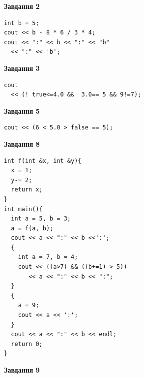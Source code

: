 \documentclass[12pt, ukrainian]{article}
\begin{document}
{\begin {large}
\begin{minipage}[t]{7.0cm}
\end{minipage}
\vline \hspace{1mm}
\begin{minipage}[t]{11.0cm}

\begin{center}
\textbf{Завдання 2}
\end{center}
\vspace{-8mm}

\begin{verbatim}
int b = 5;
cout << b - 8 * 6 / 3 * 4;
cout << ":" << b << ":" << "b" 
  << ":" << 'b';
\end{verbatim}



\begin{center}
\textbf{Завдання 3}
\end{center}
\vspace{-8mm}

\begin{verbatim}
cout 
  << (! true<=4.0 &&  3.0== 5 && 9!=7);
\end{verbatim}



\begin{center}
\textbf{Завдання 5}
\end{center}
\vspace{-8mm}

\begin{verbatim}
cout << (6 < 5.0 > false == 5);
\end{verbatim}



\begin{center}
\textbf{Завдання 8}
\end{center}
\vspace{-8mm}

\begin{verbatim}
int f(int &x, int &y){
  x = 1;
  y-= 2;
  return x;
}
int main(){
  int a = 5, b = 3;
  a = f(a, b);
  cout << a << ":" << b <<':';
  {
    int a = 7, b = 4;
    cout << ((a>7) && ((b+=1) > 5))
       << a << ":" << b << ":";
  }
  {
    a = 9;
    cout << a << ':';
  }
  cout << a << ":" << b << endl;
  return 0;
}
\end{verbatim}

\end{minipage}


\begin{minipage}[t]{7.0cm}

\begin{center}
\textbf{Завдання 9}
\end{center}
\vspace{-8mm}


\end{minipage}
\end{large}}
\end{document}
